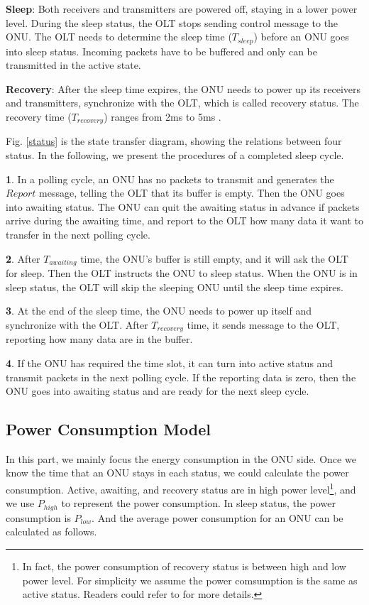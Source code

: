 \documentclass[journal]{IEEEtran}
\begin{document}
\textbf{Sleep}: Both receivers and transmitters are powered off, staying in a lower power level. During the sleep status, the OLT stops sending control message to the ONU. The OLT needs to determine the sleep time ($T_{sleep}$) before an ONU goes into sleep status. Incoming packets have to be buffered and only can be transmitted in the active state.

\textbf{Recovery}: After the sleep time expires, the ONU needs to power up its receivers and transmitters, synchronize with the OLT, which is called recovery status. The recovery time ($T_{recovery}$) ranges from 2ms to 5ms \cite{mandin2008epon}.

Fig. \ref{status} is the state transfer diagram, showing the relations between four status. In the following, we present the procedures of a completed sleep cycle.

\textbf{1}. In a polling cycle, an ONU has no packets to transmit and generates the $Report$ message, telling the OLT that its buffer is empty. Then the ONU goes into awaiting status. The ONU 
can quit the awaiting status in advance if packets arrive during the awaiting time, and report to the OLT how many data it want to transfer in the next polling cycle.

\textbf{2}. After $T_{awaiting}$ time, the ONU's buffer is still empty, and it will ask the OLT for sleep. Then the OLT instructs the ONU to sleep status. When the ONU is in sleep status, the OLT will skip the sleeping ONU until the sleep time expires.

\textbf{3}. At the end of the sleep time, the ONU needs to power up itself and synchronize with the OLT. After $T_{recovery}$ time, it sends message to the OLT, reporting how many data are in the buffer. 

\textbf{4}. If the ONU has required the time slot, it can turn into active status and transmit packets in the next polling cycle. If the reporting data is zero, then the ONU goes into awaiting status and are ready for the next sleep cycle.

\subsection{Power Consumption Model}
In this part, we mainly focus the energy consumption in the ONU side. Once we know the time that an ONU stays in each status, we could calculate the power consumption. Active, awaiting, and recovery status are in high power level\footnote{In fact, the power consumption of recovery status is between high and low power level. For simplicity we assume the power comsumption is the same as active status. Readers could refer to \cite{6172273} for more details.}, and we use $P_{high}$ to represent the power consumption. In sleep status, the power consumption is $P_{low}$. And the average power consumption for an ONU can be calculated as follows.
\end{document}
